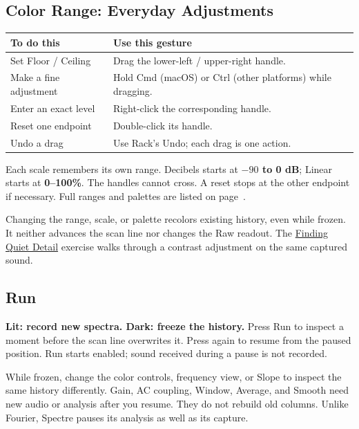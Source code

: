 \clearpage
\subsection*{Color Range: Everyday Adjustments}

\begin{center}
\renewcommand{\arraystretch}{1.4}
\begin{tabularx}{\textwidth}{@{}p{}X@{}}
\toprule
\textbf{To do this} & \textbf{Use this gesture} \\
\midrule
Set Floor / Ceiling & Drag the lower-left / upper-right handle. \\
Make a fine adjustment & Hold Cmd (macOS) or Ctrl (other platforms) while dragging. \\
Enter an exact level & Right-click the corresponding handle. \\
Reset one endpoint & Double-click its handle. \\
Undo a drag & Use Rack's Undo; each drag is one action. \\
\bottomrule
\end{tabularx}
\end{center}

Each scale remembers its own range. Decibels starts at \textbf{$-90$ to 0 dB};
Linear starts at \textbf{0--100\%}. The handles cannot cross. A reset stops
at the other endpoint if necessary. Full ranges and palettes are listed on
page~\pageref{sec:control-values}.

Changing the range, scale, or palette recolors existing history, even while
frozen. It neither advances the scan line nor changes the Raw readout.
The \hyperref[sec:detail]{Finding Quiet Detail} exercise walks through a
contrast adjustment on the same captured sound.

\subsection{Run}

\textbf{Lit: record new spectra. Dark: freeze the history.} Press Run to
inspect a moment before the scan line overwrites it. Press again to resume
from the paused position. Run starts enabled; sound received during a pause
is not recorded.

While frozen, change the color controls, frequency view, or Slope to inspect
the same history differently. Gain, AC coupling, Window, Average, and Smooth
need new audio or analysis after you resume. They do not rebuild old columns.
Unlike Fourier, Spectre pauses its analysis as well as its capture.

